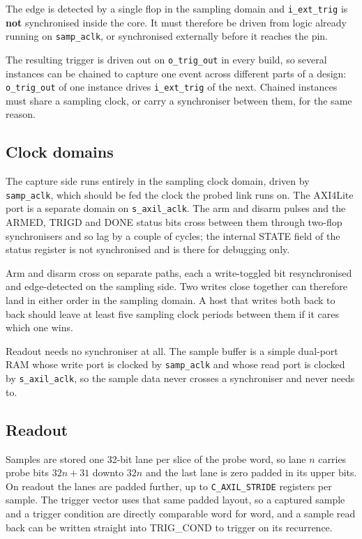 \documentclass[twocolumn]{article}
\begin{document}
The edge is detected by a single flop in the sampling domain and \texttt{i\_ext\_trig} is \textbf{not} synchronised inside the core. It must therefore be driven from logic already running on \texttt{samp\_aclk}, or synchronised externally before it reaches the pin.

The resulting trigger is driven out on \texttt{o\_trig\_out} in every build, so several instances can be chained to capture one event across different parts of a design: \texttt{o\_trig\_out} of one instance drives \texttt{i\_ext\_trig} of the next. Chained instances must share a sampling clock, or carry a synchroniser between them, for the same reason.

\subsection{Clock domains}
The capture side runs entirely in the sampling clock domain, driven by \texttt{samp\_aclk}, which should be fed the clock the probed link runs on. The AXI4Lite port is a separate domain on \texttt{s\_axil\_aclk}. The arm and disarm pulses and the ARMED, TRIGD and DONE status bits cross between them through two-flop synchronisers and so lag by a couple of cycles; the internal STATE field of the status register is not synchronised and is there for debugging only.

Arm and disarm cross on separate paths, each a write-toggled bit resynchronised and edge-detected on the sampling side. Two writes close together can therefore land in either order in the sampling domain. A host that writes both back to back should leave at least five sampling clock periods between them if it cares which one wins.

Readout needs no synchroniser at all. The sample buffer is a simple dual-port RAM whose write port is clocked by \texttt{samp\_aclk} and whose read port is clocked by \texttt{s\_axil\_aclk}, so the sample data never crosses a synchroniser and never needs to.

\subsection{Readout}
Samples are stored one 32-bit lane per slice of the probe word, so lane $n$ carries probe bits $32n+31$ downto $32n$ and the last lane is zero padded in its upper bits. On readout the lanes are padded further, up to \texttt{C\_AXIL\_STRIDE} registers per sample. The trigger vector uses that same padded layout, so a captured sample and a trigger condition are directly comparable word for word, and a sample read back can be written straight into TRIG\_COND to trigger on its recurrence.
\end{document}
